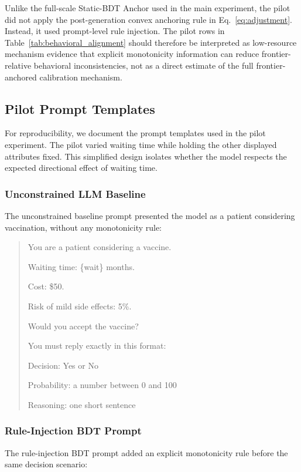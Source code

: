 \documentclass[11pt]{article}
\begin{document}
Unlike the full-scale Static-BDT Anchor used in the main experiment, the pilot did not apply the post-generation convex anchoring rule in Eq.~\eqref{eq:adjustment}. Instead, it used prompt-level rule injection. The pilot rows in Table~\ref{tab:behavioral_alignment} should therefore be interpreted as low-resource mechanism evidence that explicit monotonicity information can reduce frontier-relative behavioral inconsistencies, not as a direct estimate of the full frontier-anchored calibration mechanism.

\subsection{Pilot Prompt Templates}

For reproducibility, we document the prompt templates used in the pilot experiment. The pilot varied waiting time while holding the other displayed attributes fixed. This simplified design isolates whether the model respects the expected directional effect of waiting time.

\subsubsection{Unconstrained LLM Baseline}

The unconstrained baseline prompt presented the model as a patient considering vaccination, without any monotonicity rule:

\begin{quote}
\small
You are a patient considering a vaccine.

Waiting time: \{wait\} months.

Cost: \$50.

Risk of mild side effects: 5\%.

Would you accept the vaccine?

You must reply exactly in this format:

Decision: Yes or No

Probability: a number between 0 and 100

Reasoning: one short sentence
\end{quote}

\subsubsection{Rule-Injection BDT Prompt}

The rule-injection BDT prompt added an explicit monotonicity rule before the same decision scenario:
\end{document}
